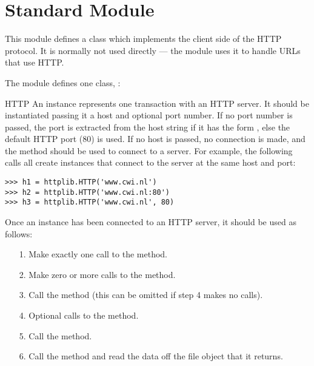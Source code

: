 \section{Standard Module }




This module defines a class which implements the client side of the
HTTP protocol.  It is normally not used directly --- the module
 uses it to handle URLs that use
HTTP.

The module defines one class, :

\begin{classdesc}{HTTP}{}
An  instance
represents one transaction with an HTTP server.  It should be
instantiated passing it a host and optional port number.  If no port
number is passed, the port is extracted from the host string if it has
the form , else the default HTTP port (80)
is used.  If no host is passed, no connection is made, and the
 method should be used to connect to a server.  For
example, the following calls all create instances that connect to the
server at the same host and port:

\begin{verbatim}
>>> h1 = httplib.HTTP('www.cwi.nl')
>>> h2 = httplib.HTTP('www.cwi.nl:80')
>>> h3 = httplib.HTTP('www.cwi.nl', 80)
\end{verbatim}

Once an  instance has been connected to an HTTP server, it
should be used as follows:

\begin{enumerate}

\item[1.] Make exactly one call to the  method.

\item[2.] Make zero or more calls to the  method.

\item[3.] Call the  method (this can be omitted if
step 4 makes no calls).

\item[4.] Optional calls to the  method.

\item[5.] Call the  method.

\item[6.] Call the  method and read the data off the
file object that it returns.

\end{enumerate}
\end{classdesc}

